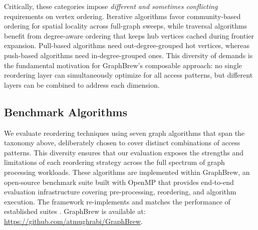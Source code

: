 \documentclass[sigconf, nonacm]{acmart}
\begin{document}
\begin{itemize}[topsep=2pt,itemsep=2pt,wide]
\end{itemize}

Critically, these categories impose \emph{different and sometimes conflicting} requirements on vertex ordering. Iterative algorithms favor community-based ordering for spatial locality across full-graph sweeps, while traversal algorithms benefit from degree-aware ordering that keeps hub vertices cached during frontier expansion. Pull-based algorithms need out-degree-grouped hot vertices, whereas push-based algorithms need in-degree-grouped ones. This diversity of demands is the fundamental motivation for GraphBrew's composable approach: no single reordering layer can simultaneously optimize for all access patterns, but different layers can be combined to address each dimension.

\subsection{Benchmark Algorithms}
\label{sec:bench_algos}

We evaluate reordering techniques using seven graph algorithms that span the taxonomy above, deliberately chosen to cover distinct combinations of access patterns. This diversity ensures that our evaluation exposes the strengths and limitations of each reordering strategy across the full spectrum of graph processing workloads. These algorithms are implemented within GraphBrew, an open-source benchmark suite built with OpenMP that provides end-to-end evaluation infrastructure covering pre-processing, reordering, and algorithm execution. The framework re-implements and matches the performance of established suites \cite{beamer_gap_2017,shun_ligra_2013}. GraphBrew is available at: \url{https://github.com/atmughrabi/GraphBrew}.
\end{document}
